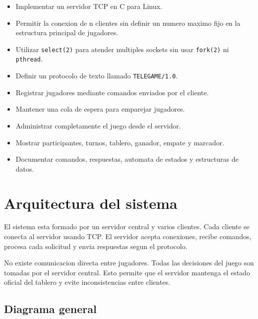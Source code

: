 \documentclass[12pt,a4paper]{article}
\begin{document}
\begin{itemize}
    \item Implementar un servidor TCP en C para Linux.
    \item Permitir la conexion de n clientes sin definir un numero maximo fijo en
    la estructura principal de jugadores.
    \item Utilizar \texttt{select(2)} para atender multiples sockets sin usar
    \texttt{fork(2)} ni \texttt{pthread}.
    \item Definir un protocolo de texto llamado \texttt{TELEGAME/1.0}.
    \item Registrar jugadores mediante comandos enviados por el cliente.
    \item Mantener una cola de espera para emparejar jugadores.
    \item Administrar completamente el juego desde el servidor.
    \item Mostrar participantes, turnos, tablero, ganador, empate y marcador.
    \item Documentar comandos, respuestas, automata de estados y estructuras de
    datos.
\end{itemize}

\section{Arquitectura del sistema}

El sistema esta formado por un servidor central y varios clientes. Cada cliente
se conecta al servidor usando TCP. El servidor acepta conexiones, recibe
comandos, procesa cada solicitud y envia respuestas segun el protocolo.

No existe comunicacion directa entre jugadores. Todas las decisiones del juego
son tomadas por el servidor central. Esto permite que el servidor mantenga el
estado oficial del tablero y evite inconsistencias entre clientes.

\subsection{Diagrama general}
\end{document}
